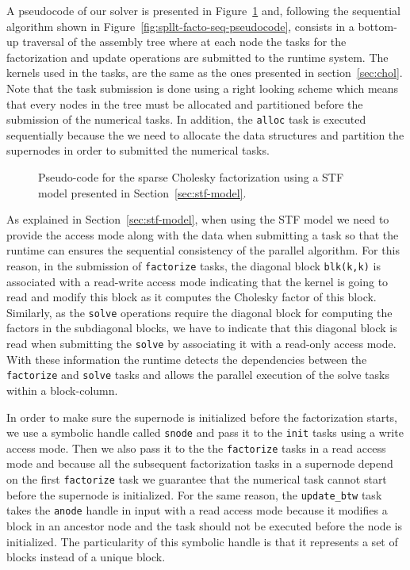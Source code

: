 \documentclass{article}
\begin{document}
A pseudocode of our solver is presented in
Figure~\ref{fig:spllt-facto-pseudocode} and, following the sequential
algorithm shown in Figure~\ref{fig:spllt-facto-seq-pseudocode},
consists in a bottom-up traversal of the assembly tree where at each
node the tasks for the factorization and update operations are
submitted to the runtime system. The kernels used in the tasks, are
the same as the ones presented in section~\ref{sec:chol}. Note that
the task submission is done using a right looking scheme which means
that every nodes in the tree must be allocated and partitioned before
the submission of the numerical tasks. In addition, the \texttt{alloc}
task is executed sequentially because the we need to allocate the data
structures and partition the supernodes in order to submitted the
numerical tasks.

\begin{figure}[!h]
  \centering 
  \caption{\label{fig:spllt-facto-pseudocode}Pseudo-code for the sparse
    Cholesky factorization using a STF model presented in
    Section~\ref{sec:stf-model}.}
\end{figure}

As explained in Section~\ref{sec:stf-model}, when using the STF model
we need to provide the access mode along with the data when submitting
a task so that the runtime can ensures the sequential consistency of
the parallel algorithm. For this reason, in the submission of
\texttt{factorize} tasks, the diagonal block \texttt{blk(k,k)} is
associated with a read-write access mode indicating that the kernel is
going to read and modify this block as it computes the Cholesky factor
of this block. Similarly, as the \texttt{solve} operations require the
diagonal block for computing the factors in the subdiagonal blocks, we
have to indicate that this diagonal block is read when submitting the
\texttt{solve} by associating it with a read-only access mode. With
these information the runtime detects the dependencies between the
\texttt{factorize} and \texttt{solve} tasks and allows the parallel
execution of the solve tasks within a block-column. 

In order to make sure the supernode is initialized before the
factorization starts, we use a symbolic handle called \texttt{snode}
and pass it to the \texttt{init} tasks using a write access mode. Then
we also pass it to the the \texttt{factorize} tasks in a read access
mode and because all the subsequent factorization tasks in a supernode
depend on the first \texttt{factorize} task we guarantee that the
numerical task cannot start before the supernode is initialized. For
the same reason, the \texttt{update\_btw} task takes the
\texttt{anode} handle in input with a read access mode because it
modifies a block in an ancestor node and the task should not be
executed before the node is initialized. The particularity of this
symbolic handle is that it represents a set of blocks instead of a
unique block.
\end{document}
